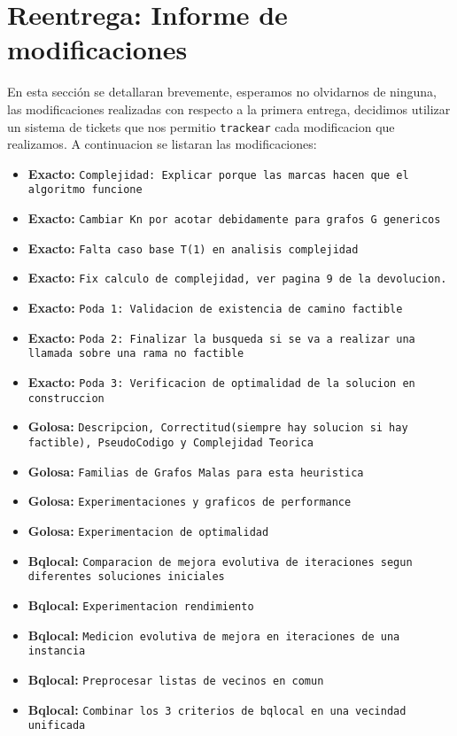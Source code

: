 \section{Reentrega: Informe de modificaciones}
En esta secci\'on se detallaran brevemente, esperamos no olvidarnos de ninguna, las modificaciones realizadas con respecto a la primera entrega, decidimos utilizar un sistema de tickets que nos permitio \texttt{trackear} cada modificacion que realizamos. A continuacion se listaran las modificaciones:
\begin{itemize}
	\item \textbf{Exacto: } \texttt{Complejidad: Explicar porque las marcas hacen que el algoritmo funcione}
	\item \textbf{Exacto: } \texttt{Cambiar Kn por acotar debidamente para grafos G genericos}
	\item \textbf{Exacto: } \texttt{Falta caso base T(1) en analisis complejidad}
	\item \textbf{Exacto: } \texttt{Fix calculo de complejidad, ver pagina 9 de la devolucion.}
	\item \textbf{Exacto: } \texttt{Poda 1: Validacion de existencia de camino factible}
	\item \textbf{Exacto: } \texttt{Poda 2: Finalizar la busqueda si se va a realizar una llamada sobre una rama no factible}
	\item \textbf{Exacto: } \texttt{Poda 3: Verificacion de optimalidad de la solucion en construccion}
	\item \textbf{Golosa: } \texttt{Descripcion, Correctitud(siempre hay solucion si hay factible), PseudoCodigo y Complejidad Teorica}
	\item \textbf{Golosa: } \texttt{Familias de Grafos Malas para esta heuristica}
	\item \textbf{Golosa: } \texttt{Experimentaciones y graficos de performance}
	\item \textbf{Golosa: } \texttt{Experimentacion de optimalidad}
	\item \textbf{Bqlocal: } \texttt{Comparacion de mejora evolutiva de iteraciones segun diferentes soluciones iniciales}
	\item \textbf{Bqlocal: } \texttt{Experimentacion rendimiento}
	\item \textbf{Bqlocal: } \texttt{Medicion evolutiva de mejora en iteraciones de una instancia}
	\item \textbf{Bqlocal: } \texttt{Preprocesar listas de vecinos en comun}
	\item \textbf{Bqlocal: } \texttt{Combinar los 3 criterios de bqlocal en una vecindad unificada}

\end{itemize}
